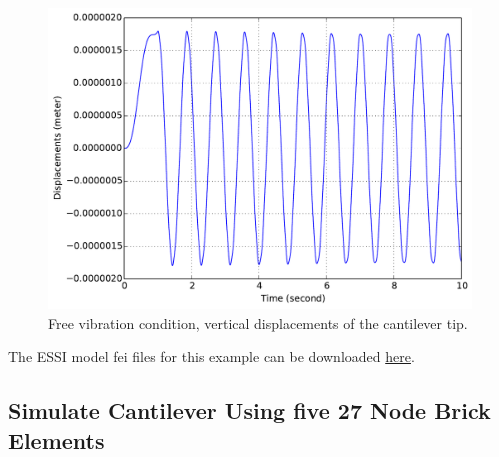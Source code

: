 \documentclass[fleqn,11pt]{article}
\begin{document}
\begin{figure}[!htb]
  \centering
  \includegraphics[width=12cm]{../Figure-files/_Chapter_Appendix_Illustrative_Examples/brick-1element-freeVibration.pdf}
  \caption{Free vibration condition, vertical displacements of the cantilever tip.}
  \label{fig_brick1-freevib}
\end{figure}


The    ESSI   model   fei   files   for   this   example   can   be   downloaded
\href{https://github.com/BorisJeremic/Real-ESSI-Examples/blob/master/model_fei_file/27NodeBrick_1element_dynamic/27NodeBrick_1element_dynamic.tgz?raw=true}{here}.











\newpage
\subsection{Simulate Cantilever Using five 27 Node Brick Elements} 


\end{document}
